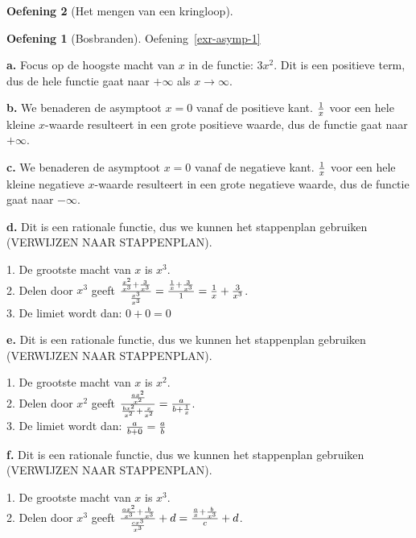 \documentclass[
  a4paper,
]{scrbook}
\theoremstyle{definition}
\newtheorem{exercise}{Oefening}[chapter]
\theoremstyle{remark}
\begin{document}
\begin{exercise}[Het mengen van een
kringloop]
\begin{exercise}[Bosbranden]

Oefening~\ref{exr-asymp-1}

\textbf{a.} Focus op de hoogste macht van \(x\) in de functie: \(3x^2\).
Dit is een positieve term, dus de hele functie gaat naar \(+ \infty\)
als \(x\to\infty\).

\textbf{b.} We benaderen de asymptoot \(x=0\) vanaf de positieve kant.
\(1\over x\) voor een hele kleine \(x\)-waarde resulteert in een grote
positieve waarde, dus de functie gaat naar \(+ \infty\).

\textbf{c.} We benaderen de asymptoot \(x=0\) vanaf de negatieve kant.
\(1\over x\) voor een hele kleine negatieve \(x\)-waarde resulteert in
een grote negatieve waarde, dus de functie gaat naar \(- \infty\).

\textbf{d.} Dit is een rationale functie, dus we kunnen het stappenplan
gebruiken (VERWIJZEN NAAR STAPPENPLAN).

1. De grootste macht van \(x\) is \(x^3\).\\
2. Delen door \(x^3\) geeft
\({{x^2\over x^3}+{3\over x^3} \over {x^3 \over x^3}} = {{1\over x}+{3\over x^3} \over 1} = {1\over x}+{3\over x^3}\).\\
3. De limiet wordt dan: \(0+0 = 0\)

\textbf{e.} Dit is een rationale functie, dus we kunnen het stappenplan
gebruiken (VERWIJZEN NAAR STAPPENPLAN).

1. De grootste macht van \(x\) is \(x^2\).\\
2. Delen door \(x^2\) geeft
\({{ax^2 \over x^2} \over {bx^2 \over x^2} + {x \over x^2}} = {a \over b + {1 \over x}}\).\\
3. De limiet wordt dan: \({a \over b + 0} = {a \over b}\)

\textbf{f.} Dit is een rationale functie, dus we kunnen het stappenplan
gebruiken (VERWIJZEN NAAR STAPPENPLAN).

1. De grootste macht van \(x\) is \(x^3\).\\
2. Delen door \(x^3\) geeft
\({{ax^2 \over x^3}+{b \over x^3} \over {cx^3 \over x^3}}+d = {{a \over x}+{b \over x^3} \over c}+d\).

\begin{tcolorbox}[enhanced jigsaw, rightrule=.15mm, opacityback=0, leftrule=.75mm, title=\textcolor{quarto-callout-caution-color}{\faFire}\hspace{0.5em}{Opgelet}, toptitle=1mm, titlerule=0mm, opacitybacktitle=0.6, colframe=quarto-callout-caution-color-frame, breakable, colbacktitle=quarto-callout-caution-color!10!white, coltitle=black, toprule=.15mm, bottomrule=.15mm, left=2mm, bottomtitle=1mm, arc=.35mm, colback=white]


\end{tcolorbox}
\end{exercise}
\end{exercise}
\end{document}
